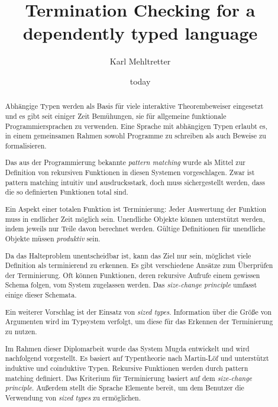 \documentclass[a4paper,11pt]{report}
\theoremstyle{remark}
\newcommand{\mugda}{\textsf{Mugda} }
\begin{document}






\title{Termination Checking for a dependently typed language}
\author{Karl Mehltretter}
\date{today}
\renewcommand{\abstractname}{Inhalt}
\begin{abstract}
Abh\"angige Typen werden als Basis f\"ur viele interaktive Theorembeweiser eingesetzt und es gibt seit einiger Zeit Bem\"uhungen, sie f\"ur allgemeine funktionale Programmiersprachen zu verwenden.
Eine Sprache mit abh\"angigen Typen erlaubt es, in einem gemeinsamen Rahmen sowohl Programme zu schreiben als auch Beweise zu formalisieren.

Das aus der Programmierung bekannte \emph{pattern matching} wurde als Mittel zur Definition von
rekursiven Funktionen in diesen Systemen vorgeschlagen.
Zwar ist pattern matching intuitiv und ausdrucksstark, doch muss sicher\-gestellt werden, dass die so definierten Funktionen total sind.

Ein Aspekt einer totalen Funktion ist Terminierung: Jeder Auswertung der Funktion muss in endlicher Zeit m\"oglich sein.  Unendliche Objekte k\"onnen unterst\"utzt werden, indem jeweils nur Teile davon berechnet werden.
G\"ultige Definitionen f\"ur unendliche Objekte m\"ussen \emph{produktiv} sein.

Da das Halteproblem unentscheidbar ist, kann das Ziel nur sein, m\"og\-lichst viele Definition als terminierend zu erkennen. Es gibt verschiedene Ans\"atze zum \"Uberpr\"ufen der Terminierung.
Oft k\"onnen Funktionen, deren rekursive Aufrufe einem gewissen Schema folgen,
 vom System zugelassen werden. Das \emph{size-change principle} umfasst einige dieser Schemata.

Ein weiterer Vorschlag ist der Einsatz von \emph{sized types}. Information \"uber die Gr\"o\ss e von Argumenten wird im Typsystem verfolgt, um diese f\"ur das Erkennen der Terminierung zu nutzen.

Im Rahmen dieser Diplomarbeit wurde das System \mugda ent\-wickelt und wird nachfolgend vorgestellt.
Es basiert auf Typentheorie nach Martin-L\"of und unterst\"utzt induktive und coinduktive Typen. Rekursive Funktionen werden  durch pattern matching definiert.
Das Kriterium f\"ur Terminierung basiert auf dem \emph{size-change principle}.
Au\ss erdem stellt die Sprache Elemente bereit, um dem Benutzer die Verwendung von \emph{sized types} zu erm\"oglichen.
\end{abstract}
\newpage
\end{document}
